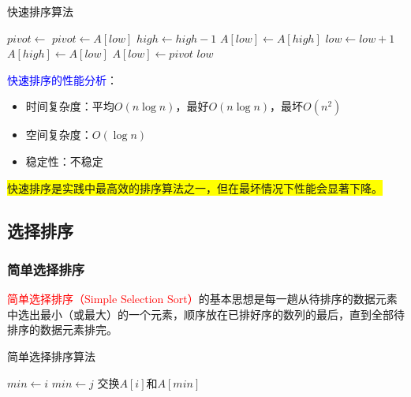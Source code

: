 \documentclass{../../note}
\begin{document}
\begin{algorithm}
  \caption{快速排序算法}
  \begin{algorithmic}[1]
    \State $pivot \gets$ 
    \State {}
    \State {}
    \EndIf
    \EndProcedure
    \State
    \State $pivot \gets A[low]$ 
    \State $high \gets high - 1$
    \EndWhile
    \State $A[low] \gets A[high]$
    \State $low \gets low + 1$
    \EndWhile
    \State $A[high] \gets A[low]$
    \EndWhile
    \State $A[low] \gets pivot$
    \Return $low$
    \EndProcedure
  \end{algorithmic}
\end{algorithm}

\textcolor{blue}{快速排序的性能分析}：
\begin{itemize}
  \item 时间复杂度：平均$O(n\log{n})$，最好$O(n\log{n})$，最坏$O(n^2)$
  \item 空间复杂度：$O(\log{n})$
  \item 稳定性：不稳定
\end{itemize}

\colorbox{yellow}{快速排序是实践中最高效的排序算法之一，但在最坏情况下性能会显著下降。}

\subsection{选择排序}

\subsubsection{简单选择排序}
\textcolor{red}{简单选择排序（Simple Selection Sort）}的基本思想是每一趟从待排序的数据元素中选出最小（或最大）的一个元素，顺序放在已排好序的数列的最后，直到全部待排序的数据元素排完。

\begin{algorithm}
  \caption{简单选择排序算法}
  \begin{algorithmic}[1]
    \State $min \gets i$
    \State $min \gets j$
    \EndIf
    \EndFor
    \State 交换$A[i]$和$A[min]$
    \EndIf
    \EndFor
    \EndProcedure
  \end{algorithmic}
\end{algorithm}
\end{document}
